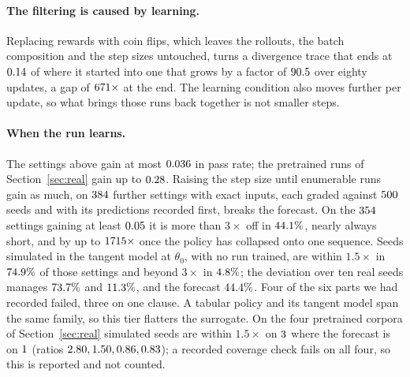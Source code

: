 \paragraph{The filtering is caused by learning.} Replacing rewards with coin flips, which leaves
the rollouts, the batch composition and the step sizes untouched, turns a divergence trace that
ends at $0.14$ of where it started into one that grows by a factor of $90.5$
over eighty updates, a gap of $671\times$ at the end. The learning condition also moves
further per update, so what brings those runs back together is not smaller steps.

\paragraph{When the run learns.} The settings above gain at most $0.036$ in pass
rate; the pretrained runs of Section~\ref{sec:real} gain up to $0.28$. Raising the
step size until enumerable runs gain as much, on $384$ further settings with exact
inputs, each graded against $500$ seeds and with its predictions recorded first,
breaks the forecast. On the $354$ settings gaining at least
$0.05$ it is more than $3\times$ off in $44.1\%$, nearly always
short, and by up to $1715\times$ once the policy has collapsed onto one
sequence. Seeds simulated in the tangent model at $\theta_0$, with no run trained, are within
$1.5\times$ in $74.9\%$ of those settings and beyond $3\times$ in
$4.8\%$; the deviation over ten real seeds manages
$73.7\%$ and $11.3\%$, and the forecast
$44.4\%$. Four of the six parts we had recorded failed, three on one clause.
A tabular policy and its tangent model span the same family, so
this tier flatters the surrogate. On the four pretrained corpora of Section~\ref{sec:real}
simulated seeds are within $1.5\times$ on $3$ where the forecast is on
$1$ (ratios $2.80, 1.50, 0.86, 0.83$); a recorded coverage check fails on
all four, so this is reported and not counted.
